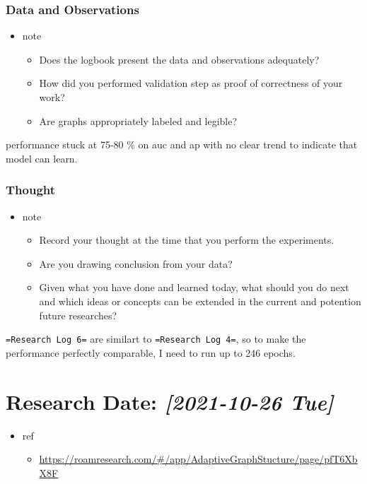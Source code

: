 \documentclass[11pt]{article}
\begin{document}
\subsubsection{Data and Observations}
\label{sec:org0106bb4}
\begin{itemize}
\item note
\begin{itemize}
\item Does the logbook present the data and observations adequately?
\item How did you performed validation step as proof of correctness of your work?
\item Are graphs appropriately labeled and legible?
\end{itemize}
\end{itemize}

performance stuck at 75-80 \% on auc and ap with no clear trend to indicate that model can learn.


\subsubsection{Thought}
\label{sec:org22e776b}
\begin{itemize}
\item note
\begin{itemize}
\item Record your thought at the time that you perform the experiments.
\item Are you drawing conclusion from your data?
\item Given what you have done and learned today, what should you do next and which ideas or concepts can be extended in the current and potention future researches?
\end{itemize}
\end{itemize}

\texttt{=Research Log 6=} are similart to \texttt{=Research Log 4=}, so to make the performance perfectly comparable, I need to run up to 246 epochs.

\section{Research Date: \textit{[2021-10-26 Tue]}}
\label{sec:orgd24f05b}
\begin{itemize}
\item ref
\begin{itemize}
\item \url{https://roamresearch.com/\#/app/AdaptiveGraphStucture/page/pfT6XbX8F}
\end{itemize}
\end{itemize}
\end{document}
